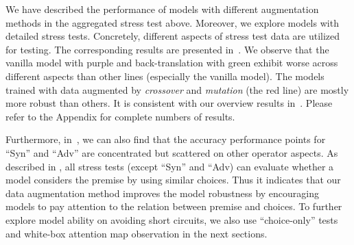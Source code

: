 We have described the performance of models with different 
augmentation methods in the aggregated stress test above. 
Moreover, we explore models with detailed stress tests. 
Concretely, different aspects of stress test data are 
utilized for testing. 
The corresponding results are presented in~. 
We observe that the vanilla model with purple and back-translation with green exhibit 
worse across different aspects than other lines (especially the vanilla model). 
The models trained with data augmented by \textit{crossover} and \textit{mutation} (the red line) 
are mostly more robust than others.
It is consistent with our overview results in~. 
Please refer to the Appendix for complete numbers of results. 

Furthermore, in~, we can also find that the 
accuracy performance points for ``Syn'' and ``Adv'' are concentrated 
but scattered on other operator aspects. 
As described in ,
all stress tests  (except ``Syn'' and ``Adv) can evaluate whether a model considers 
the premise by using similar choices. 
Thus it indicates that our data augmentation 
method improves the model robustness by encouraging models to pay attention 
to the relation between premise and choices.  
To further explore model ability on avoiding short circuits, 
we also use ``choice-only'' tests
and white-box attention map observation in the next sections.


